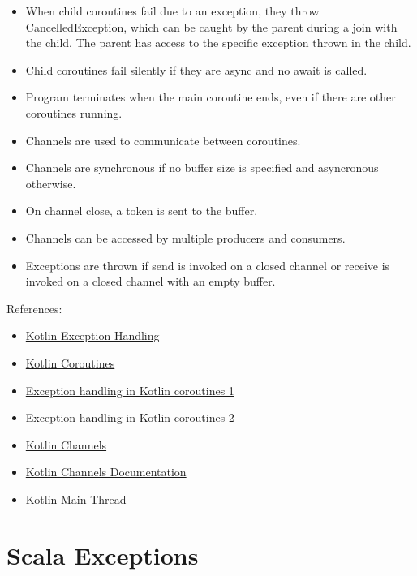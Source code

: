 \documentclass[a4paper,11pt]{article}
\theoremstyle{plain}
\theoremstyle{nonumberplain}
\begin{document}
\begin{itemize}
  \item When child coroutines fail due to an exception, they throw CancelledException, which can be caught by the parent during a join with the child. The parent has access to the specific exception thrown in the child.
  \item Child coroutines fail silently if they are async and no await is called.
  \item Program terminates when the main coroutine ends, even if there are other coroutines running.
  \item Channels are used to communicate between coroutines.
  \item Channels are synchronous if no buffer size is specified and asyncronous otherwise.
  \item On channel close, a token is sent to the buffer.
  \item Channels can be accessed by multiple producers and consumers.
  \item Exceptions are thrown if send is invoked on a closed channel or receive is invoked on a closed channel with an empty buffer.
\end{itemize}

References:

\begin{itemize}
  \item \href{https://kotlinlang.org/docs/exceptions.html}{Kotlin Exception Handling}
  \item \href{https://kotlinlang.org/docs/exception-handling.html}{Kotlin Coroutines}
  \item \href{https://medium.com/the-kotlin-chronicle/coroutine-exceptions-3378f51a7d33}{Exception handling in Kotlin coroutines 1}
  \item \href{https://medium.com/@jecco_man/why-exception-handling-with-kotlin-coroutines-is-so-hard-and-how-to-successfully-master-it-3c6064a62d3e}{Exception handling in Kotlin coroutines 2}
  \item \href{https://kotlinlang.org/docs/channels.html}{Kotlin Channels}
  \item \href{https://kotlinlang.org/api/kotlinx.coroutines/kotlinx-coroutines-core/kotlinx.coroutines.channels/}{Kotlin Channels Documentation}
  \item \href{https://stackoverflow.com/questions/71682402/kotlin-not-waiting-for-a-coroutine-to-finish}{Kotlin Main Thread}
\end{itemize}

\section{Scala Exceptions}
\end{document}
